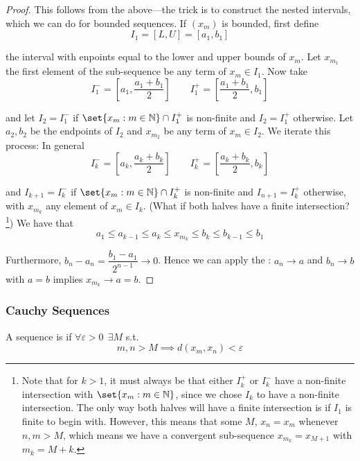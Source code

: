 \documentclass{article}
\begin{document}
\begin{proof}
  This follows from the  above---the trick is to construct the nested intervals, which we can do for bounded sequences. If $(x_m)$ is bounded, first define
  \[
    I_1 = [L, U] = [a_1, b_1]
  \]

  the interval with enpoints equal to the lower and upper bounds of $x_m$. Let $x_{m_1}$ the first element of the sub-sequence be any term of $x_m \in I_1$. Now take
  \[
    I_1^- = \left[a_1, \dfrac{a_1 + b_1}{2}\right]
    \quad\quad
    I_1^+ = \left[\dfrac{a_1 + b_1}{2}, b_1\right]
  \]

  and let $I_2 = I_1^-$ if $\set{x_m: m \in \mathbb{N}} \cap I_1^+$ is non-finite and $I_2 = I_1^+$ otherwise. Let $a_2, b_2$ be the endpoints of $I_2$ and $x_{m_2}$ be any term of $x_m \in I_2$. We iterate this process: In general
  \[
    I_k^- = \left[a_k, \dfrac{a_k + b_k}{2}\right]
    \quad\quad
    I_k^+ = \left[\dfrac{a_k + b_k}{2}, b_k\right]
  \]

  and $I_{k + 1} = I_k^-$ if $\set{x_m: m \in \mathbb{N}} \cap I_k^+$ is non-finite and $I_{n + 1} = I_k^+$ otherwise, with $x_{m_k}$ any element of $x_m \in I_k$. (What if both halves have a finite intersection?\footnote{Note that for $k > 1$, it must always be that either $I_k^+$ or $I_k^-$ have a non-finite intersection with $\set{x_m: m \in \mathbb{N}}$, since we chose $I_k$ to have a non-finite intersection.  The only way both halves will have a finite intersection is if $I_1$ is finite to begin with. However, this means that some $M$, $x_n = x_m$ whenever $n, m > M$, which means we have a convergent sub-sequence $x_{m_k} = x_{M + 1}$ with $m_k = M + k$.}) We have that
  \[
    a_1 \le a_{k - 1} \le a_k \le x_{m_k} \le b_k \le b_{k - 1} \le b_1
  \]

  Furthermore, $b_n - a_n = \dfrac{b_1 - a_1}{2^{n - 1}} \to 0$. Hence we can apply the : $a_n \to a$ and $b_n \to b$ with $a = b$ implies $x_{m_k} \to a = b$.
\end{proof}

\subsubsection{Cauchy Sequences}
\label{ssub:cauchy_sequences}

\begin{definition}
  A sequence is  if $\forall \varepsilon > 0 ~~\exists M$ s.t.
  \[
    m, n > M \implies d(x_m, x_n) < \varepsilon
  \]
\end{definition}
\end{document}
